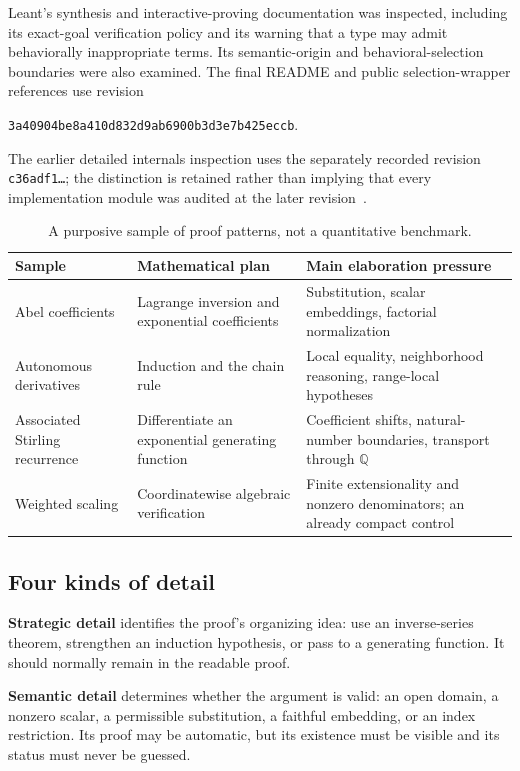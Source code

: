 \documentclass[11pt,a4paper]{article}
\newcommand{\Q}{\mathbb Q}
\theoremstyle{remark}
\begin{document}
Leant's synthesis and interactive-proving documentation was inspected, including its exact-goal verification policy and its warning that a type may admit behaviorally inappropriate terms. Its semantic-origin and behavioral-selection boundaries were also examined. The final README and public selection-wrapper references use revision
\begin{center}\small\texttt{3a40904be8a410d832d9ab6900b3d3e7b425eccb}.\end{center}
The earlier detailed internals inspection uses the separately recorded revision \texttt{c36adf1\ldots}; the distinction is retained rather than implying that every implementation module was audited at the later revision~\cite{leant-readme,leant-internals,leant-selection}.

\begin{table}[htbp]
\centering\small
\begin{tabularx}{\textwidth}{@{}p{}Xp{}@{}}
\toprule
Sample & Mathematical plan & Main elaboration pressure \\
\midrule
Abel coefficients & Lagrange inversion and exponential coefficients & Substitution, scalar embeddings, factorial normalization \\
Autonomous derivatives & Induction and the chain rule & Local equality, neighborhood reasoning, range-local hypotheses \\
Associated Stirling recurrence & Differentiate an exponential generating function & Coefficient shifts, natural-number boundaries, transport through $\Q$ \\
Weighted scaling & Coordinatewise algebraic verification & Finite extensionality and nonzero denominators; an already compact control \\
\bottomrule
\end{tabularx}
\caption{A purposive sample of proof patterns, not a quantitative benchmark.}
\label{tab:sample}
\end{table}

\subsection{Four kinds of detail}

\textbf{Strategic detail} identifies the proof's organizing idea: use an inverse-series theorem, strengthen an induction hypothesis, or pass to a generating function. It should normally remain in the readable proof.

\textbf{Semantic detail} determines whether the argument is valid: an open domain, a nonzero scalar, a permissible substitution, a faithful embedding, or an index restriction. Its proof may be automatic, but its existence must be visible and its status must never be guessed.
\end{document}
